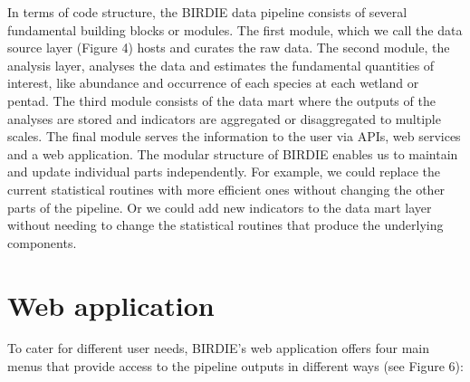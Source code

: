\documentclass[utf8]{frontiersSCNS}
\begin{document}
In terms of code structure, the BIRDIE data pipeline consists of several
fundamental building blocks or modules. The first module, which we call
the data source layer (Figure 4) hosts and curates the raw data. The
second module, the analysis layer, analyses the data and estimates the
fundamental quantities of interest, like abundance and occurrence of
each species at each wetland or pentad. The third module consists of the
data mart where the outputs of the analyses are stored and indicators
are aggregated or disaggregated to multiple scales. The final module
serves the information to the user via APIs, web services and a web
application. The modular structure of BIRDIE enables us to maintain and
update individual parts independently. For example, we could replace the
current statistical routines with more efficient ones without changing
the other parts of the pipeline. Or we could add new indicators to the
data mart layer without needing to change the statistical routines that
produce the underlying components.

\hypertarget{web-application}{%
\section*{Web application}\label{web-application}}

To cater for different user needs, BIRDIE's web application offers four
main menus that provide access to the pipeline outputs in different ways
(see Figure 6):
\end{document}
